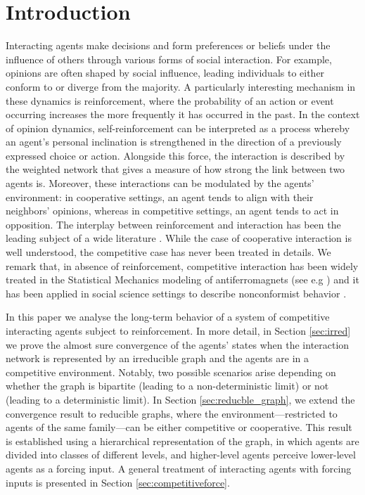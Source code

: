 \documentclass[article,12pt]{article}
\theoremstyle{plain}
\theoremstyle{definition}
\theoremstyle{remark}
\numberwithin{equation}{section}
\numberwithin{theorem}{section}
\begin{document}
	\section{Introduction}
		Interacting agents make decisions and form preferences or beliefs under the influence of others through various forms of social interaction. For example, opinions are often shaped by social influence, leading individuals to either conform to or diverge from the majority. A particularly interesting mechanism in these dynamics is reinforcement, where the probability of an action or event occurring increases the more frequently it has occurred in the past. In the context of opinion dynamics, self-reinforcement can be interpreted as a process whereby an agent’s personal inclination is strengthened in the direction of a previously expressed choice or action. Alongside this force, the interaction is described by the weighted network that gives a measure of how strong the link between two agents is. Moreover, these interactions can be modulated by the agents’ environment: in cooperative settings, an agent tends to align with their neighbors’ opinions, whereas in competitive settings, an agent tends to act in opposition.
		The interplay between reinforcement and interaction has been the leading subject of a wide literature \cite{aletti2017synchronization,Aletti_Crimaldi_Ghiglietti_2019,Aletti_Crimaldi_Ghiglietti_2020,Aletti_Ghiglietti_2017,aletti2024networksProb,aletti2024networks,Benaim_Benjamini_Chen_Lima_2015,Chen_Lucas_2014,Crimaldi_DaiPra_Louis_Minelli_2019,Crimaldi2016,Crimaldi2023,dai2014synchronization,Lima2016,Louis2018,mirebrahimi2024synchronization,Paganoni2004,Sahasrabudhe2016}. While the case of cooperative interaction is well understood, the competitive case has never been treated in details. We remark that, in absence of reinforcement, competitive interaction has been widely treated in the Statistical Mechanics modeling of antiferromagnets (see e.g \cite{binek2003ising,wu1989critical}) and it has been applied in social science settings to describe nonconformist behavior \cite{AleMin19Lotka,AleMin21delay,touboul2019hipster}.
		
		In this paper we analyse the long-term behavior of a system of competitive interacting agents subject to reinforcement.
		In more detail, in Section \ref{sec:irred} we prove the almost sure convergence of the agents’ states when the interaction network is represented by an irreducible graph and the agents are in a competitive environment. Notably, two possible scenarios arise depending on whether the graph is bipartite (leading to a non-deterministic limit) or not (leading to a deterministic limit). In Section \ref{sec:reducble_graph}, we extend the convergence result to reducible graphs, where the environment—restricted to agents of the same family—can be either competitive or cooperative. This result is established using a hierarchical representation of the graph, in which agents are divided into classes of different levels, and higher-level agents perceive lower-level agents as a forcing input. A general treatment of interacting agents with forcing inputs is presented in Section \ref{sec:competitiveforce}.
		
\end{document}
